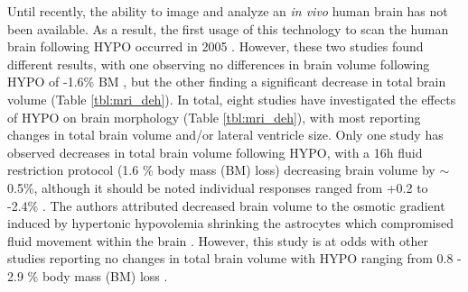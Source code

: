 Until recently, the ability to image and analyze an \textit{in vivo} human brain has not been available. As a result, the first usage of this technology to scan the human brain following HYPO occurred in 2005 \cite{dickson_effects_2005, duning_dehydration_2005}. However, these two studies found different results, with one observing no differences in brain volume following HYPO of -1.6\% BM \cite{dickson_effects_2005}, but the other finding a significant decrease in total brain volume \cite{duning_dehydration_2005} (Table \ref{tbl:mri_deh}). In total, eight studies have investigated the effects of HYPO on brain morphology (Table \ref{tbl:mri_deh}), with most reporting changes in total brain volume and/or lateral ventricle size. Only one study has observed decreases in total brain volume following HYPO, with a 16h fluid restriction protocol (1.6 \% body mass (BM) loss) decreasing brain volume by ${\sim}$0.5\%, although it should be noted individual responses ranged from +0.2 to -2.4\% \cite{duning_dehydration_2005}. The authors attributed decreased brain volume to the osmotic gradient induced by hypertonic hypovolemia shrinking the astrocytes which compromised fluid movement within the brain \cite{duning_dehydration_2005}. However, this study is at odds with other studies reporting no changes in total brain volume with HYPO ranging from 0.8 - 2.9 \% body mass (BM) loss \cite{watson_effect_2010,kempton_effects_2009,kempton_dehydration_2011,meyers_does_2016}.

